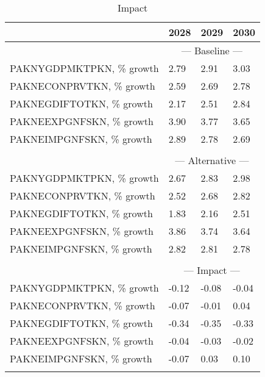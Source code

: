 \documentclass{article}
\begin{document}
 \begin{table}
\caption{Impact}
\begin{tabular}{llll}
\toprule
 & 2028 & 2029 & 2030 \\
\midrule
&\multicolumn{3}{c}{--- Baseline ---}                                                             \\
PAKNYGDPMKTPKN, \% growth &                 2.79 &                 2.91 &                 3.03 \\
PAKNECONPRVTKN, \% growth &                 2.59 &                 2.69 &                 2.78 \\
PAKNEGDIFTOTKN, \% growth &                 2.17 &                 2.51 &                 2.84 \\
PAKNEEXPGNFSKN, \% growth &                 3.90 &                 3.77 &                 3.65 \\
PAKNEIMPGNFSKN, \% growth &                 2.89 &                 2.78 &                 2.69 \\
&\multicolumn{3}{c}{     }                                                             \\
&\multicolumn{3}{c}{--- Alternative ---}                                                             \\
PAKNYGDPMKTPKN, \% growth &                 2.67 &                 2.83 &                 2.98 \\
PAKNECONPRVTKN, \% growth &                 2.52 &                 2.68 &                 2.82 \\
PAKNEGDIFTOTKN, \% growth &                 1.83 &                 2.16 &                 2.51 \\
PAKNEEXPGNFSKN, \% growth &                 3.86 &                 3.74 &                 3.64 \\
PAKNEIMPGNFSKN, \% growth &                 2.82 &                 2.81 &                 2.78 \\
&\multicolumn{3}{c}{     }                                                             \\
&\multicolumn{3}{c}{--- Impact ---}                                                             \\
PAKNYGDPMKTPKN, \% growth &                -0.12 &                -0.08 &                -0.04 \\
PAKNECONPRVTKN, \% growth &                -0.07 &                -0.01 &                 0.04 \\
PAKNEGDIFTOTKN, \% growth &                -0.34 &                -0.35 &                -0.33 \\
PAKNEEXPGNFSKN, \% growth &                -0.04 &                -0.03 &                -0.02 \\
PAKNEIMPGNFSKN, \% growth &                -0.07 &                 0.03 &                 0.10 \\
&\multicolumn{3}{c}{     }                                                             \\
\bottomrule
\end{tabular}
\end{table}
\end{document}
